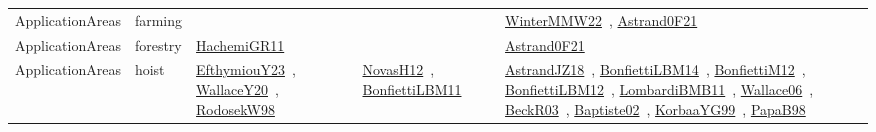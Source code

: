 {\begin{longtable}{lp{3cm}>{\raggedright\arraybackslash}p{6cm}>{\raggedright\arraybackslash}p{6cm}>{\raggedright\arraybackslash}p{8cm}}
ApplicationAreas & farming &  &  & \href{works/WinterMMW22.pdf}{WinterMMW22}~\cite{WinterMMW22}, \href{works/Astrand0F21.pdf}{Astrand0F21}~\cite{Astrand0F21}\\
ApplicationAreas & forestry & \href{works/HachemiGR11.pdf}{HachemiGR11}~\cite{HachemiGR11} &  & \href{works/Astrand0F21.pdf}{Astrand0F21}~\cite{Astrand0F21}\\
ApplicationAreas & hoist & \href{works/EfthymiouY23.pdf}{EfthymiouY23}~\cite{EfthymiouY23}, \href{works/WallaceY20.pdf}{WallaceY20}~\cite{WallaceY20}, \href{works/RodosekW98.pdf}{RodosekW98}~\cite{RodosekW98} & \href{works/NovasH12.pdf}{NovasH12}~\cite{NovasH12}, \href{works/BonfiettiLBM11.pdf}{BonfiettiLBM11}~\cite{BonfiettiLBM11} & \href{works/AstrandJZ18.pdf}{AstrandJZ18}~\cite{AstrandJZ18}, \href{works/BonfiettiLBM14.pdf}{BonfiettiLBM14}~\cite{BonfiettiLBM14}, \href{works/BonfiettiM12.pdf}{BonfiettiM12}~\cite{BonfiettiM12}, \href{works/BonfiettiLBM12.pdf}{BonfiettiLBM12}~\cite{BonfiettiLBM12}, \href{works/LombardiBMB11.pdf}{LombardiBMB11}~\cite{LombardiBMB11}, \href{works/Wallace06.pdf}{Wallace06}~\cite{Wallace06}, \href{works/BeckR03.pdf}{BeckR03}~\cite{BeckR03}, \href{works/Baptiste02.pdf}{Baptiste02}~\cite{Baptiste02}, \href{works/KorbaaYG99.pdf}{KorbaaYG99}~\cite{KorbaaYG99}, \href{works/PapaB98.pdf}{PapaB98}~\cite{PapaB98}\\

\end{longtable}}
